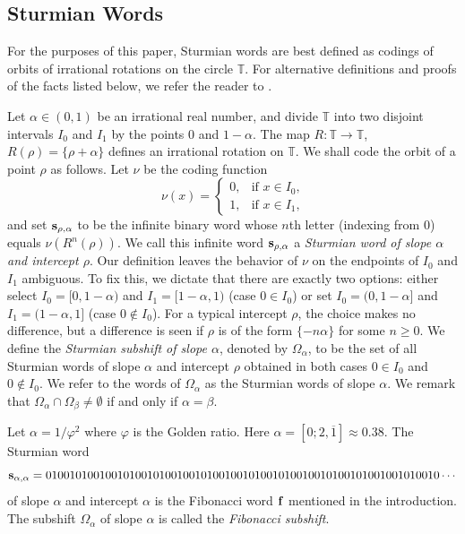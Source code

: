 \documentclass[a4paper,fleqn]{article}
\newcommand{\infw}[1]{%
  \ifcat\noexpand#1\relax\bm{#1}%
  \else\mathbf{#1}\fi}          %
\newcommand{\T}{\mathbb{T}}
\begin{document}
  \subsection{Sturmian Words}
  For the purposes of this paper, Sturmian words are best defined as codings of orbits of irrational rotations on the
  circle $\T$. For alternative definitions and proofs of the facts listed below, we refer the reader to
  \cite{2002:algebraic_combinatorics_on_words,2002:substitutions_in_dynamics_arithmetics_and_combinatorics}.

  Let $\alpha \in (0, 1)$ be an irrational real number, and divide $\T$ into two disjoint intervals $I_0$ and $I_1$ by
  the points $0$ and $1 - \alpha$. The map $R\colon \T \to \T$, $R(\rho) = \{\rho + \alpha\}$ defines an irrational
  rotation on $\T$. We shall code the orbit of a point $\rho$ as follows. Let $\nu$ be the coding function
  \begin{equation*}
    \nu(x) = \begin{cases}
               0, &\text{if $x \in I_0$,} \\
               1, &\text{if $x \in I_1$,}
             \end{cases}
  \end{equation*}
  and set $\infw{s}_{\rho,\alpha}$ to be the infinite binary word whose $n$th letter (indexing from $0$) equals
  $\nu(R^n(\rho))$. We call this infinite word $\infw{s}_{\rho,\alpha}$ a \emph{Sturmian word of slope $\alpha$ and
  intercept $\rho$}. Our definition leaves the behavior of $\nu$ on the endpoints of $I_0$ and $I_1$ ambiguous. To fix
  this, we dictate that there are exactly two options: either select $I_0 = [0, 1-\alpha)$ and $I_1 = [1-\alpha, 1)$
  (case $0 \in I_0$) or set $I_0 = (0, 1-\alpha]$ and $I_1 = (1-\alpha, 1]$ (case $0 \notin I_0$). For a typical
  intercept $\rho$, the choice makes no difference, but a difference is seen if $\rho$ is of the form $\{-n\alpha\}$
  for some $n \geq 0$. We define the \emph{Sturmian subshift of slope $\alpha$}, denoted by $\Omega_\alpha$, to be the
  set of all Sturmian words of slope $\alpha$ and intercept $\rho$ obtained in both cases $0 \in I_0$ and $0 \notin I_0$.
  We refer to the words of $\Omega_\alpha$ as the Sturmian words of slope $\alpha$. We remark that
  $\Omega_\alpha \cap \Omega_\beta \neq \emptyset$ if and only if $\alpha = \beta$.

  \begin{example}
    Let $\alpha = 1/\varphi^2$ where $\varphi$ is the Golden ratio. Here $\alpha = [0; 2, \overline{1}] \approx 0.38$.
    The Sturmian word
    \begin{equation*}
      \infw{s}_{\alpha,\alpha} = 010010100100101001010010010100100101001010010010100101001001010010 \dotsm
    \end{equation*}
    of slope $\alpha$ and intercept $\alpha$ is the Fibonacci word $\infw{f}$ mentioned in the introduction. The
    subshift $\Omega_\alpha$ of slope $\alpha$ is called the \emph{Fibonacci subshift}.
  \end{example}
\end{document}
